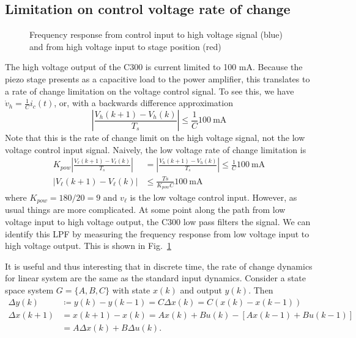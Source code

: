 \documentclass[journal,12pt,onecolumn,draftclsnofoot,,twoside]{IEEEtran/IEEEtran}
\begin{document}
\subsection{Limitation on control voltage rate of change}
\begin{figure}
  \centering
  
  \caption{Frequency response from control input to high voltage signal (blue) and from high voltage input to stage position (red)}
  \label{fig:powfrf}
\end{figure}

The high voltage output of the C300 is current limited to 100 mA. Because the piezo stage presents as a capacitive load to the power amplifier, this translates to a rate of change limitation on the voltage control signal. To see this, we have $\dot v_{h} = \frac{1}{C} i_c(t)$, or, with a backwards difference approximation
\begin{equation}
  |\frac{V_{h}(k+1) - V_{h}(k)}{T_s}| \leq \frac{1}{C} 100~\text{mA}
\end{equation}
Note that this is the rate of change limit on the high voltage signal, not the low voltage control input signal. Naively, the low voltage rate of change limitation is
\begin{align}
K_{pow}|\frac{V_{\ell}(k+1) - V_{\ell}(k)}{T_s}|  &= |\frac{V_{h}(k+1) - V_{h}(k)}{T_s}| \leq \frac{1}{C} 100~\text{mA}\\
|V_{\ell}(k+1) - V_{\ell}(k)|  &\leq \frac{Ts}{K_{pow}C} 100~\text{mA}
\end{align}
where $K_{pow} = 180/20 = 9$ and $v_{\ell}$ is the low voltage control input. However, as usual things are more complicated. At some point along the path from low voltage input to high voltage output, the C300 low pass filters the signal. We can identify this LPF by measuring the frequency response from low voltage input to high voltage output. This is shown in Fig.~\ref{fig:powfrf}

It is useful and thus interesting that in discrete time, the rate of change dynamics for linear system are the same as the standard input dynamics. Consider a state space system $G=\{A,B,C\}$ with state $x(k)$ and output $y(k)$. Then
\begin{align}
  \Delta y(k) &\coloneqq y(k) - y(k-1) = C\Delta x(k) = C(x(k) - x(k-1))\\
  \Delta x(k+1) &= x(k+1) - x(k) = Ax(k) + B u(k) - [Ax(k-1) + Bu(k-1)]\\
              &= A \Delta x(k) + B\Delta u(k).
\end{align}
\end{document}
